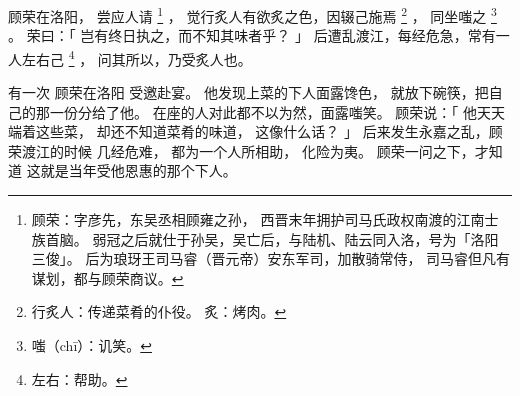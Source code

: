 
\switchcolumn*[\section{}]

顾荣在洛阳，
尝应人请%
\footnote{%
    顾荣：字彦先，东吴丞相顾雍之孙，
          西晋末年拥护司马氏政权南渡的江南士族首脑。
          弱冠之后就仕于孙吴，吴亡后，与陆机、陆云同入洛，号为「洛阳三俊」。
          后为琅玡王司马睿（晋元帝）安东军司，加散骑常侍，
          司马睿但凡有谋划，都与顾荣商议。
}%
，
觉行炙人有欲炙之色，因辍己施焉%
\footnote{%
    行炙人：传递菜肴的仆役。
    炙：烤肉。
}%
，
同坐嗤之%
\footnote{%
    嗤（chī）：讥笑。
}%
。
荣曰：「
    岂有终日执之，而不知其味者乎？
」
后遭乱渡江，每经危急，常有一人左右己%
\footnote{%
    左右：帮助。
}%
，
问其所以，乃受炙人也。

\switchcolumn

有一次
顾荣在洛阳
受邀赴宴。
他发现上菜的下人面露馋色，
就放下碗筷，把自己的那一份分给了他。
在座的人对此都不以为然，面露嗤笑。
顾荣说：「
    他天天端着这些菜，
    却还不知道菜肴的味道，
    这像什么话？
」
后来发生永嘉之乱，顾荣渡江的时候
几经危难，
都为一个人所相助，
化险为夷。
顾荣一问之下，才知道
这就是当年受他恩惠的那个下人。

